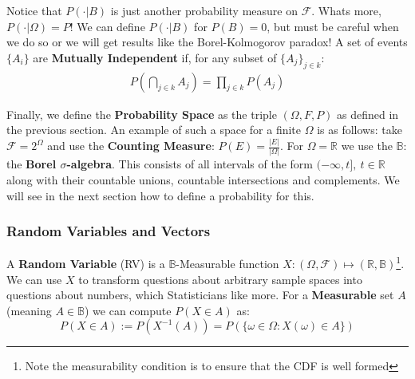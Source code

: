 \documentclass[]{article}
\theoremstyle{mattstyle}
\theoremstyle{definition}
\begin{document}
Notice that $P(\cdot|B)$ is just another probability measure on \(\mathcal{F}\). Whats more, $P(\cdot|\Omega) = P$! We can define $P(\cdot|B)$ for $P(B)=0$, but must be careful when we do so or we will get results like the Borel-Kolmogorov paradox! A set of events \(\{A_i\}\) are \textbf{Mutually Independent} if, for any subset of \(\{A_j\}_{j\in k}\):
\begin{align*}
P \left( \bigcap_{j\in k} A_j \right) = \prod_{j\in k}P(A_j) 
\end{align*}

Finally, we define the \textbf{Probability Space} as the triple \( (\Omega, F, P)\) as defined in the previous section. An example of such a space for a finite $\Omega$ is as follows: take $\mathcal{F}=2^{\Omega}$ and use the \textbf{Counting Measure}: $P(E) = \frac{|E|}{|\Omega|}$. For $\Omega = \mathbb{R}$ we use the $\mathbb{B}$: the \textbf{Borel $\sigma$-algebra}. This consists of all intervals of the form $(-\infty, t], \ t \in \mathbb{R}$ along with their countable unions, countable intersections and complements. We will see in the next section how to define a probability for this.

\subsubsection{Random Variables and Vectors}\label{sec:RVs}

A \textbf{Random Variable} (RV) is a \(\mathbb{B}\)-Measurable function  \(X: (\Omega, \mathcal{F}) \mapsto (\mathbb{R},\mathbb{B}) \)\footnote{Note the measurability condition is to ensure that the CDF is well formed}. 
 We can use $X$ to transform questions about arbitrary sample spaces into questions about numbers, which Statisticians like more. For a \textbf{Measurable} set $A$ (meaning \( A \in \mathbb{B}\)) we can compute \( P(X \in A)\) as:
$$P(X \in A) := P(X^{-1}(A)) = P(\{ \omega \in \Omega : X(\omega) \in A \})$$
\end{document}
